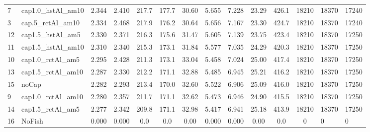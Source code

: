\documentclass[11pt]{book}
\begin{document}
\begin{turn}
\begin{longtable}[t]{llccccccccccll}
7 & cap1.0\_hstAl\_am10 & 2.344 & 2.410 & 217.7 & 177.7 & 30.60 & 5.655 & 7.228 & 23.29 & 426.1 & 18210 & 18370 & 17240\\
3 & cap.5\_rctAl\_am10 & 2.334 & 2.468 & 217.9 & 176.2 & 30.64 & 5.656 & 7.167 & 23.30 & 424.7 & 18210 & 18370 & 17240\\
12 & cap1.5\_hstAl\_am5 & 2.330 & 2.371 & 216.3 & 175.6 & 31.47 & 5.605 & 7.139 & 23.75 & 423.4 & 18210 & 18370 & 17250\\
11 & cap1.5\_hstAl\_am10 & 2.310 & 2.340 & 215.3 & 173.1 & 31.84 & 5.577 & 7.035 & 24.29 & 420.3 & 18210 & 18370 & 17250\\
10 & cap1.0\_rctAl\_am5 & 2.295 & 2.428 & 211.3 & 173.1 & 33.04 & 5.458 & 7.024 & 25.00 & 417.4 & 18210 & 18370 & 17250\\
13 & cap1.5\_rctAl\_am10 & 2.287 & 2.330 & 212.2 & 171.1 & 32.88 & 5.485 & 6.945 & 25.21 & 416.2 & 18210 & 18370 & 17250\\
15 & noCap & 2.282 & 2.293 & 213.4 & 170.0 & 32.60 & 5.522 & 6.906 & 25.09 & 416.0 & 18210 & 18370 & 17250\\
9 & cap1.0\_rctAl\_am10 & 2.280 & 2.357 & 211.7 & 171.1 & 32.62 & 5.473 & 6.946 & 24.90 & 415.5 & 18210 & 18370 & 17250\\
14 & cap1.5\_rctAl\_am5 & 2.277 & 2.342 & 209.8 & 171.1 & 32.98 & 5.417 & 6.941 & 25.18 & 413.9 & 18210 & 18370 & 17250\\
16 & NoFish & 0.000 & 0.000 & 0.0 & 0.0 & 0.00 & 0.000 & 0.000 & 0.00 & 0.0 & 0 & 0 & 0\\
\bottomrule
\end{longtable}
\endgroup{}
\endgroup{}





\newpage


\end{turn}
\end{document}
